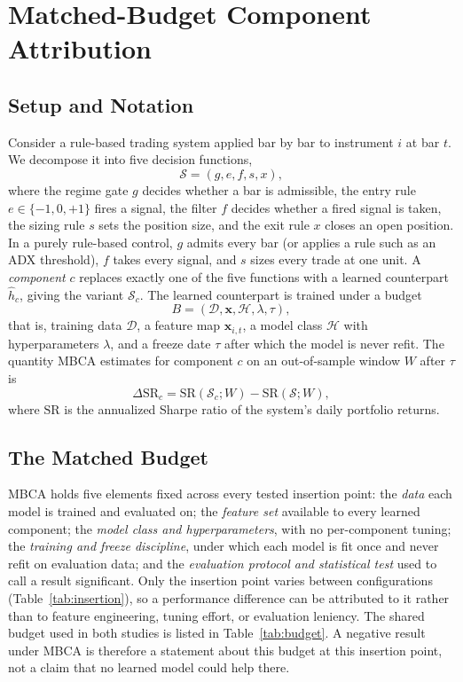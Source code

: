 \section{Matched-Budget Component Attribution}
\label{sec:method}

\subsection{Setup and Notation}
\label{sec:setup}

Consider a rule-based trading system applied bar by bar to instrument $i$ at bar $t$. We decompose it into five
decision functions,
\begin{equation}
\mathcal{S} = (g, e, f, s, x),
\end{equation}
where the regime gate $g$ decides whether a bar is admissible, the entry rule $e \in \{-1, 0, +1\}$ fires a signal,
the filter $f$ decides whether a fired signal is taken, the sizing rule $s$ sets the position size, and the exit rule
$x$ closes an open position. In a purely rule-based control, $g$ admits every bar (or applies a rule such as an ADX
threshold), $f$ takes every signal, and $s$ sizes every trade at one unit. A \emph{component} $c$ replaces exactly one
of the five functions with a learned counterpart $\hat h_c$, giving the variant $\mathcal{S}_c$. The learned
counterpart is trained under a budget
\begin{equation}
B = (\mathcal{D}, \mathbf{x}, \mathcal{H}, \lambda, \tau),
\end{equation}
that is, training data $\mathcal{D}$, a feature map $\mathbf{x}_{i,t}$, a model class $\mathcal{H}$ with
hyperparameters $\lambda$, and a freeze date $\tau$ after which the model is never refit. The quantity MBCA
estimates for component $c$ on an out-of-sample window $W$ after $\tau$ is
\begin{equation}
\Delta\mathrm{SR}_c = \mathrm{SR}(\mathcal{S}_c; W) - \mathrm{SR}(\mathcal{S}; W),
\end{equation}
where $\mathrm{SR}$ is the annualized Sharpe ratio of the system's daily portfolio returns.

\subsection{The Matched Budget}

MBCA holds five elements fixed across every tested insertion point: the \emph{data} each model is trained and
evaluated on; the \emph{feature set} available to every learned component; the \emph{model class and
hyperparameters}, with no per-component tuning; the \emph{training and freeze discipline}, under which each model is
fit once and never refit on evaluation data; and the \emph{evaluation protocol and statistical test} used to call a
result significant. Only the insertion point varies between configurations (Table~\ref{tab:insertion}), so a
performance difference can be attributed to it rather than to feature engineering, tuning effort, or evaluation
leniency. The shared budget used in both studies is listed in Table~\ref{tab:budget}. A negative result under MBCA is
therefore a statement about this budget at this insertion point, not a claim that no learned model could help there.

